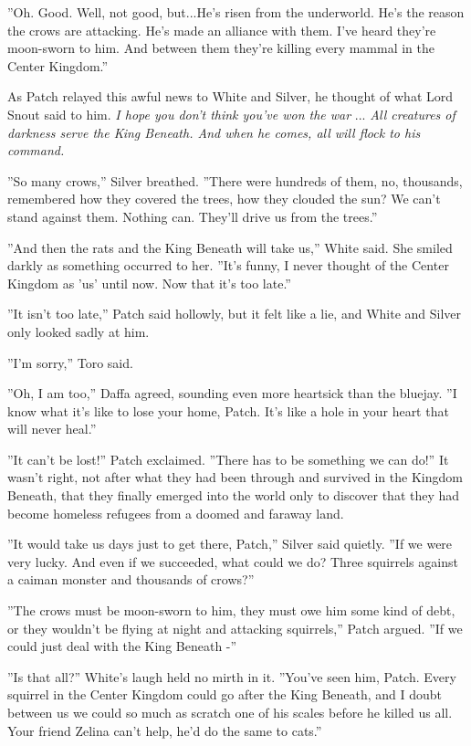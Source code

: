 \documentclass[11pt]{article}
\begin{document}
 ''Oh. Good. Well, not good, but...He's risen from the underworld. He's the reason the crows are attacking. He's made an alliance with them. I've heard they're moon-sworn to him. And between them they're killing every mammal in the Center Kingdom.''\par
 As Patch relayed this awful news to White and Silver, he thought of what Lord Snout said to him. {\it I hope you don't think you've won the war} ... {\it All creatures of darkness serve the King Beneath. And when he comes, all will flock to his command.}\par
 ''So many crows,'' Silver breathed. ''There were hundreds of them, no, thousands, remembered how they covered the trees, how they clouded the sun? We can't stand against them. Nothing can. They'll drive us from the trees.''\par
 ''And then the rats and the King Beneath will take us,'' White said. She smiled darkly as something occurred to her. ''It's funny, I never thought of the Center Kingdom as 'us' until now. Now that it's too late.''\par
 ''It isn't too late,'' Patch said hollowly, but it felt like a lie, and White and Silver only looked sadly at him.\par
 ''I'm sorry,'' Toro said.\par
 ''Oh, I am too,'' Daffa agreed, sounding even more heartsick than the bluejay. ''I know what it's like to lose your home, Patch. It's like a hole in your heart that will never heal.''\par
 ''It can't be lost!'' Patch exclaimed. ''There has to be something we can do!'' It wasn't right, not after what they had been through and survived in the Kingdom Beneath, that they finally emerged into the world only to discover that they had become homeless refugees from a doomed and faraway land.\par
''It would take us days just to get there, Patch,'' Silver said quietly. ''If we were very lucky. And even if we succeeded, what could we do? Three squirrels against a caiman monster and thousands of crows?'' \par
 ''The crows must be moon-sworn to him, they must owe him some kind of debt, or they wouldn't be flying at night and attacking squirrels,'' Patch argued. ''If we could just deal with the King Beneath -''\par
 ''Is that all?'' White's laugh held no mirth in it. ''You've seen him, Patch. Every squirrel in the Center Kingdom could go after the King Beneath, and I doubt between us we could so much as scratch one of his scales before he killed us all. Your friend Zelina can't help, he'd do the same to cats.''\par
\end{document}
